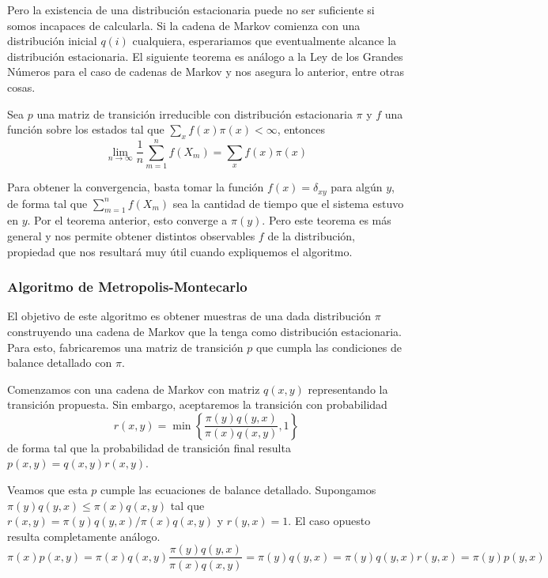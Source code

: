 Pero la existencia de una distribución estacionaria puede no ser suficiente si somos incapaces de calcularla.
Si la cadena de Markov comienza con una distribución inicial $q(i)$ cualquiera, esperariamos que eventualmente alcance la distribución estacionaria.
El siguiente teorema es análogo a la Ley de los Grandes Números para el caso de cadenas de Markov y nos asegura lo anterior, entre otras cosas.

\begin{theorem}{\label{teo:markov_muestreo}}
 Sea $p$ una matriz de transición irreducible con distribución estacionaria $\pi$ y $f$ una función sobre los estados tal que $\sum_x f(x)\pi(x) < \infty$, entonces
 \[ \lim_{n\to\infty} \frac{1}{n} \sum_{m=1}^n f(X_m) = \sum_x f(x)\pi(x) \]
\end{theorem}

Para obtener la convergencia, basta tomar la función $f(x) = \delta_{xy}$ para algún $y$, de forma tal que $\sum_{m=1}^n f(X_m)$ sea la cantidad de tiempo que el sistema estuvo en $y$.
Por el teorema anterior, esto converge a $\pi(y)$. 
Pero este teorema es más general y nos permite obtener distintos observables $f$ de la distribución, propiedad que nos resultará muy útil cuando expliquemos el algoritmo. 


\subsubsection{Algoritmo de Metropolis-Montecarlo}{\label{sec:alg_mm}}

El objetivo de este algoritmo es obtener muestras de una dada distribución $\pi$ construyendo una cadena de Markov que la tenga como distribución estacionaria.
Para esto, fabricaremos una matriz de transición $p$ que cumpla las condiciones de balance detallado con $\pi$.

Comenzamos con una cadena de Markov con matriz $q(x,y)$ representando la transición propuesta.
Sin embargo, aceptaremos la transición con probabilidad 
\[r(x,y) = \min \left\{ \frac{\pi(y)q(y,x)}{\pi(x)q(x,y)}, 1\right\}\]
de forma tal que la probabilidad de transición final resulta $p(x,y) = q(x,y)r(x,y)$.

Veamos que esta $p$ cumple las ecuaciones de balance detallado.
Supongamos $\pi(y)q(y,x) \leq \pi(x)q(x,y)$ tal que $r(x,y) = \pi(y)q(y,x)/\pi(x)q(x,y)$ y $r(y,x) = 1$. 
El caso opuesto resulta completamente análogo.
\[ \pi(x) p(x, y) = \pi(x) q(x,y)\frac{\pi(y)q(y,x)}{\pi(x)q(x,y)} = \pi(y)q(y,x) = \pi(y)q(y,x)r(y,x) = \pi(y)p(y,x) \]

